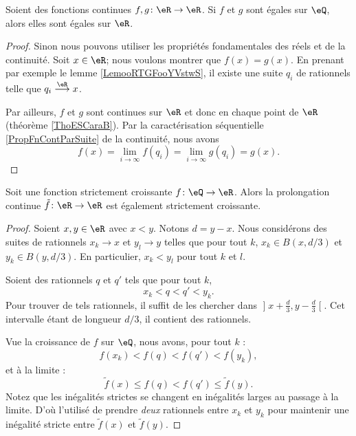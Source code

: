 \begin{proposition}     \label{PROPooXWHYooFiVYfi}
    Soient des fonctions continues \( f,g\colon \eR\to \eR\). Si \( f\) et \( g\) sont égales sur \( \eQ\), alors elles sont égales sur \( \eR\).
\end{proposition}

\begin{proof}
    Sinon nous pouvons utiliser les propriétés fondamentales des réels et de la continuité. Soit \( x\in \eR\); nous voulons montrer que \( f(x)=g(x)\). En prenant par exemple le lemme \ref{LemooRTGFooYVstwS}, il existe une suite \( q_i\) de rationnels telle que \( q_i\stackrel{\eR}{\longrightarrow}x\). 
    
    Par ailleurs, \( f\) et \( g\) sont continues sur \( \eR\) et donc en chaque point de \( \eR\) (théorème \ref{ThoESCaraB}). Par la caractérisation séquentielle \ref{PropFnContParSuite} de la continuité, nous avons
    \begin{equation}
        f(x)=\lim_{i\to \infty} f(q_i)=\lim_{i\to \infty} g(q_i)=g(x).
    \end{equation}
\end{proof}

\begin{proposition}      \label{PROPooTNIAooNAJDzL}
    Soit une fonction strictement croissante \( f\colon \eQ\to \eR\). Alors la prolongation continue \( \tilde f\colon \eR\to \eR\) est également strictement croissante.
\end{proposition}

\begin{proof}
    Soient \( x,y\in \eR\) avec \( x<y\). Notons \( d=y-x\). Nous considérons des suites de rationnels \( x_k\to x\) et \( y_l\to y\) telles que pour tout \( k\), \( x_k\in B(x,d/3)\) et \( y_k\in B(y,d/3)\). En particulier, \( x_k<y_l\) pour tout \( k\) et \( l\).

    Soient des rationnels \( q\) et \( q'\) tels que pour tout \( k\),
    \begin{equation}
        x_k<q<q'<y_k.
    \end{equation}
    Pour trouver de tels rationnels, il suffit de les chercher dans \( \mathopen] x+\frac{ d }{ 3 } , y-\frac{ d }{ 3 } \mathclose[\). Cet intervalle étant de longueur \( d/3\), il contient des rationnels.

    Vue la croissance de \( f\) sur \( \eQ\), nous avons, pour tout \( k\) :
    \begin{equation}
        f(x_k)<f(q)<f(q')<f(y_k),
    \end{equation}
    et à la limite :
    \begin{equation}
        \tilde f(x)\leq f(q)<f(q')\leq \tilde f(y).
    \end{equation}
    Notez que les inégalités strictes se changent en inégalités larges au passage à la limite. D'où l'utilisé de prendre \emph{deux} rationnels entre \( x_k\) et \( y_k\) pour maintenir une inégalité stricte entre \(\tilde f(x)\) et \( \tilde f(y)\).
\end{proof}


